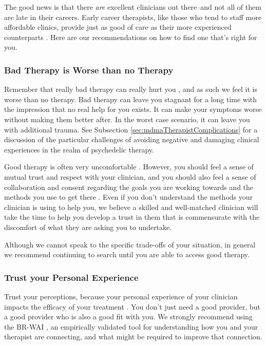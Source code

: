 \documentclass[12pt,letterpaper]{book}
\begin{document}
The good news is that there \textit{are} excellent clinicians out there–and not all of them are late  in their careers. Early career therapists, like those who tend to staff more affordable clinics, provide just as good of care as their more experienced counterparts \cite{goldberg2016psychotherapists}. Here are our recommendations on how to find one that's right for you.

\subsubsection*{Bad Therapy is Worse than no Therapy}
Remember that really bad therapy can really hurt you \cite{hook2018boundary}, and as such we feel it is worse than no therapy. Bad therapy can leave you stagnant for a long time with the impression that no real help for you exists. It can make your symptoms worse without making them better after. In the worst case scenario, it can leave you with additional trauma. See Subsection \ref{sec:mdmaTherapistComplications} for a discussion of the particular challenges of avoiding negative and damaging clinical experiences in the realm of psychedelic therapy.

Good therapy is often very uncomfortable \cite{eckerUnlocking}. However, you should feel a sense of mutual trust and respect with your clinician, and you should also feel a sense of collaboration and consent regarding the goals you are working towards and the methods you use to get there \cite{BRWAIdownload}. Even if you don't understand the methods your clinician is using to help you, we believe a skilled and well-matched clinician will take the time to help you develop a trust in them that is commensurate with the discomfort of what they are asking you to undertake.

Although we cannot speak to the specific trade-offs of your situation, in general we recommend continuing to search until you are able to access good therapy.

\subsubsection*{Trust your Personal Experience}
Trust your perceptions, because your personal experience of your clinician impacts the efficacy of your treatment \cite{horvath2011alliance}. You don't just need a good provider, but a good provider who is also a good fit with you. We strongly recommend using the BR-WAI \cite{BRWAIdownload}, an empirically validated tool for understanding how you and your therapist are connecting, and what might be required to improve that connection.
\end{document}
